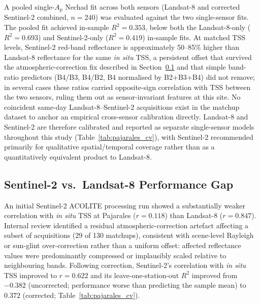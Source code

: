 \documentclass[remotesensing,article,submit,pdftex,moreauthors]{Definitions/mdpi}
\begin{document}
A pooled single-$A_p$ Nechad fit across both sensors (Landsat-8 and
corrected Sentinel-2 combined, $n=240$) was evaluated against the two
single-sensor fits. The pooled fit achieved in-sample $R^2 = 0.353$,
below both the Landsat-8-only ($R^2 = 0.693$) and Sentinel-2-only
($R^2 = 0.419$) in-sample fits. At matched TSS levels, Sentinel-2
red-band reflectance is approximately 50--85\% higher than Landsat-8
reflectance for the same \textit{in situ} TSS, a persistent offset that
survived the atmospheric-correction fix described in
Section~\ref{sec:disc_s2gap} and that simple band-ratio predictors
(B4/B3, B4/B2, B4 normalised by B2+B3+B4) did not remove; in several
cases these ratios carried opposite-sign correlation with TSS between
the two sensors, ruling them out as sensor-invariant features at this
site. No coincident same-day Landsat-8--Sentinel-2 acquisitions exist
in the matchup dataset to anchor an empirical cross-sensor calibration
directly. Landsat-8 and Sentinel-2 are therefore calibrated and
reported as separate single-sensor models throughout this study
(Table~\ref{tab:pajarales_cv}), with Sentinel-2 recommended primarily
for qualitative spatial/temporal coverage rather than as a
quantitatively equivalent product to Landsat-8.
 
 
\subsection{Sentinel-2 vs.\ Landsat-8 Performance Gap}
\label{sec:disc_s2gap}
 
An initial Sentinel-2 ACOLITE processing run showed a substantially
weaker correlation with \textit{in situ} TSS at Pajarales ($r = 0.118$)
than Landsat-8 ($r = 0.847$). Internal review identified a residual
atmospheric-correction artefact affecting a subset of acquisitions (29
of 130 matchups), consistent with scene-level Rayleigh or sun-glint
over-correction rather than a uniform offset: affected reflectance
values were predominantly compressed or implausibly scaled relative to
neighbouring bands. Following correction, Sentinel-2's correlation with
\textit{in situ} TSS improved to $r = 0.622$ and its leave-one-station-out
$R^2$ improved from $-0.382$ (uncorrected; performance worse than
predicting the sample mean) to $0.372$ (corrected;
Table~\ref{tab:pajarales_cv}).
\end{document}
